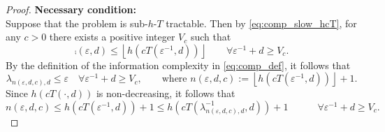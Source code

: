 \documentclass[sort&compress]{elsarticle}
\begin{document}
\begin{proof}
\bigskip

\noindent \textbf{Necessary condition:}\\
Suppose that the problem is  sub-$h$-$T$ tractable. Then by \eqref{eq:comp_slow_hcT}, for any $c>0$ there exists a positive integer $V_c$ such that
\begin{equation*}
	\comp(\varepsilon,d) \le \left\lfloor h(cT(\varepsilon^{-1},d)) \right\rfloor \qquad \forall \varepsilon^{-1} + d \ge V_c.
\end{equation*}
By the definition of the information complexity in \eqref{eq:comp_def}, it follows that
\[
	\lambda_{n(\varepsilon,d,c),d} \le \varepsilon \quad \forall \varepsilon^{-1} + d \ge V_c, \qquad \text{where }
	n(\varepsilon,d,c):=\left\lfloor h(cT(\varepsilon^{-1},d)) \right\rfloor +1.
\]
Since $h(cT(\cdot,d))$ is non-decreasing, it follows that
\begin{equation}
		n(\varepsilon,d,c)\le  h(cT(\varepsilon^{-1},d)) +1\le  h(cT(\lambda^{-1}_{n(\varepsilon,d,c),d},d)) +1\qquad  \quad \forall \varepsilon^{-1} + d \ge V_c. \label{eq:nedcbound}
\end{equation}


\end{proof}
\end{document}
